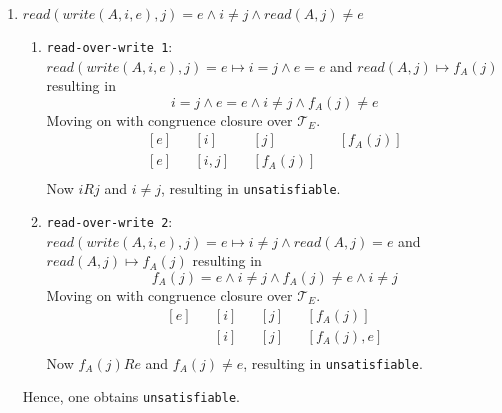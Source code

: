\documentclass[11pt,a4paper]{article}
\begin{document}
\begin{enumerate}
\item $read(write(A, i, e), j) = e \land i \neq j \land read(A, j) \neq e$
\begin{enumerate}
\item \texttt{read-over-write 1}: \\
$read(write(A, i, e), j) = e \mapsto i = j \land e = e$ and $read(A,j) \mapsto f_A(j)$ resulting in 
\begin{equation*}
i = j \land e = e \land i \neq j \land f_A(j) \neq e
\end{equation*}
Moving on with congruence closure over $\mathcal{T}_E$.
\begin{align*}
&[e]& &[i]& &[j]& &[f_A(j)]& \\ 
&[e]& &[i,j]& &[f_A(j)]& \\ 
\end{align*}
Now $iRj$ and $i \neq j$, resulting in \texttt{unsatisfiable}.
\item \texttt{read-over-write 2}: \\
$read(write(A, i, e), j) = e \mapsto i \neq j \land read(A,j) = e$ and $read(A,j) \mapsto f_A(j)$ resulting in 
\begin{equation*}
f_A(j) = e \land i \neq j \land f_A(j) \neq e \land i \neq j 
\end{equation*}
Moving on with congruence closure over $\mathcal{T}_E$.
\begin{align*}
&[e]& &[i]& &[j]& &[f_A(j)]& \\ 
& & &[i]& &[j]& &[f_A(j), e]& \\ 
\end{align*}
Now $f_A(j)Re$ and $f_A(j) \neq e$, resulting in \texttt{unsatisfiable}.
\end{enumerate}
Hence, one obtains \texttt{unsatisfiable}.



\end{enumerate}
\end{document}
